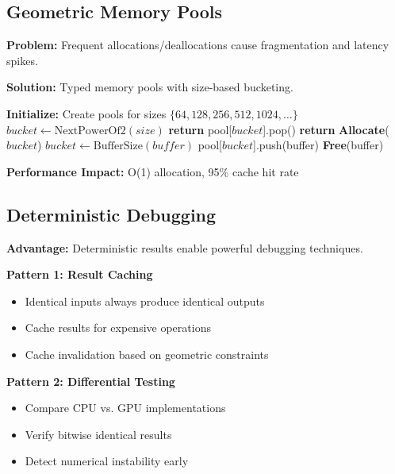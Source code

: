 \documentclass{article}
\begin{document}
\subsection{Geometric Memory Pools}

\textbf{Problem:} Frequent allocations/deallocations cause fragmentation and latency spikes.

\textbf{Solution:} Typed memory pools with size-based bucketing.

\begin{algorithm}[H]
\caption{Memory Pool Management}
\begin{algorithmic}[1]
\State \textbf{Initialize:} Create pools for sizes $\{64, 128, 256, 512, 1024, \ldots\}$
    \State $bucket \leftarrow \text{NextPowerOf2}(size)$
        \State \textbf{return} pool[$bucket$].pop()
    \Else
        \State \textbf{return} \textbf{Allocate}($bucket$)
    \EndIf
\EndFunction
{}
    \State $bucket \leftarrow \text{BufferSize}(buffer)$
        \State pool[$bucket$].push(buffer)
    \Else
        \State \textbf{Free}(buffer)
    \EndIf
\EndFunction
\end{algorithmic}
\end{algorithm}

\textbf{Performance Impact:} O(1) allocation, 95\% cache hit rate

\subsection{Deterministic Debugging}

\textbf{Advantage:} Deterministic results enable powerful debugging techniques.

\textbf{Pattern 1: Result Caching}
\begin{itemize}
    \item Identical inputs always produce identical outputs
    \item Cache results for expensive operations
    \item Cache invalidation based on geometric constraints
\end{itemize}

\textbf{Pattern 2: Differential Testing}
\begin{itemize}
    \item Compare CPU vs. GPU implementations
    \item Verify bitwise identical results
    \item Detect numerical instability early
\end{itemize}
\end{document}
